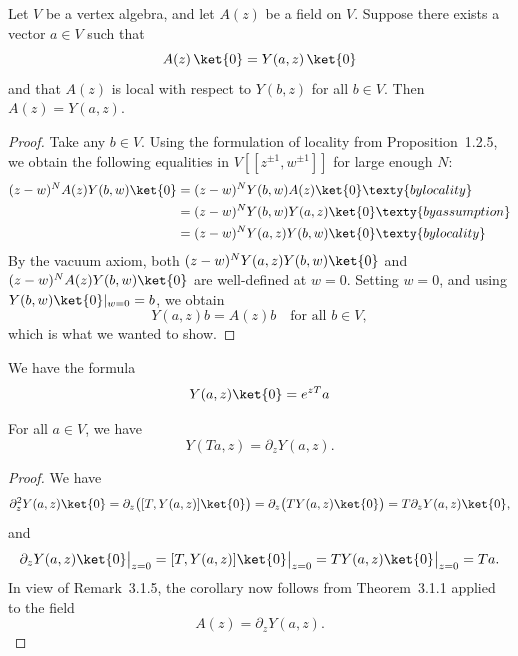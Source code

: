 \documentclass[12pt]{article}
\begin{document}
\begin{theorem}
    Let $V$ be a vertex algebra, and let $A(z)$ be a field on $V$.
    Suppose there exists a vector $a \in V$ such that
    \[
        A(z)\,\ket{0} = Y(a,z)\,\ket{0}
    \]
    and that $A(z)$ is local with respect to $Y(b,z)$ for all $b \in V$.
    Then $A(z) = Y(a,z)$.
\end{theorem}

\begin{proof}
    Take any $b \in V$.
    Using the formulation of locality from Proposition~1.2.5,
    we obtain the following equalities in $V[[z^{\pm1}, w^{\pm1}]]$ for large enough $N$:
    \begin{align*}
        (z-w)^N A(z)Y(b,w)\ket{0} & = (z-w)^N Y(b,w)A(z)\ket{0} \texty{ by locality}    \\
                                  & = (z-w)^N Y(b,w)Y(a,z)\ket{0} \texty{by assumption} \\
                                  & = (z-w)^N Y(a,z)Y(b,w)\ket{0} \texty{ by locality}
    \end{align*}
    By the vacuum axiom, both $(z-w)^N Y(a,z)Y(b,w)\ket{0}$ and $(z-w)^N A(z)Y(b,w)\ket{0}$
    are well-defined at $w=0$.
    Setting $w=0$, and using $Y(b,w)\ket{0}|_{w=0} = b$, we obtain
    \[
        Y(a,z)b = A(z)b \quad \text{for all } b \in V,
    \]
    which is what we wanted to show.
\end{proof}
\begin{lemma}
    We have the formula \begin{align*}
        Y(a,z)\ket{0} = e^{zT}a
    \end{align*}
\end{lemma}

\begin{corollary}
    For all $a \in V$, we have
    \[
        Y(Ta, z) = \partial_z Y(a, z).
    \]
\end{corollary}

\begin{proof}
    We have
    \[
        \partial_z^2 Y(a, z)\ket{0}
        = \partial_z\big([T, Y(a, z)]\ket{0}\big)
        = \partial_z\big(TY(a, z)\ket{0}\big)
        = T\partial_z Y(a, z)\ket{0},
    \]
    and
    \[
        \partial_z Y(a, z)\ket{0}\big|_{z=0}
        = [T, Y(a, z)]\ket{0}\big|_{z=0}
        = TY(a, z)\ket{0}\big|_{z=0}
        = Ta.
    \]
    In view of Remark~3.1.5, the corollary now follows from Theorem~3.1.1 applied to the field
    \[
        A(z) = \partial_z Y(a, z).
    \]
\end{proof}
\end{document}
